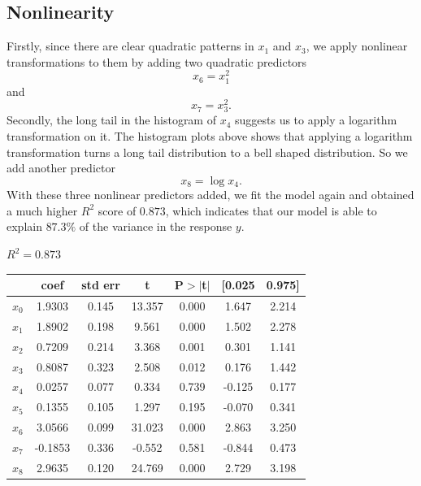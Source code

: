 \documentclass{article}
\begin{document}
\subsection{Nonlinearity}
Firstly, since there are clear quadratic patterns in $x_1$ and $x_3$, we apply nonlinear transformations to them by adding two quadratic predictors $$x_6 = x_1^2 $$ and $$x_7 = x_3^2.$$ Secondly, the long tail in the histogram of $x_4$ suggests us to apply a logarithm transformation on it. The histogram plots above shows that applying a logarithm transformation turns a long tail distribution to a bell shaped distribution. So we add another predictor $$x_8 = \log x_4.$$ With these three nonlinear predictors added, we fit the model again and obtained a much higher $R^2$ score of $0.873$, which indicates that our model is able to explain $87.3\%$ of the variance in the response $y$. 
\begin{center}
$R^2 = 0.873$\\
\begin{tabular}{lcccccc}
\hline
           & \textbf{coef} & \textbf{std err} & \textbf{t} & \textbf{P$> |$t$|$} & \textbf{[0.025} & \textbf{0.975]}  \\
\midrule
\textbf{$x_0$} &       1.9303  &        0.145     &    13.357  &         0.000        &        1.647    &        2.214     \\
\textbf{$x_1$} &       1.8902  &        0.198     &     9.561  &         0.000        &        1.502    &        2.278     \\
\textbf{$x_2$} &       0.7209  &        0.214     &     3.368  &         0.001        &        0.301    &        1.141     \\
\textbf{$x_3$} &       0.8087  &        0.323     &     2.508  &         0.012        &        0.176    &        1.442     \\
\textbf{$x_4$} &       0.0257  &        0.077     &     0.334  &         0.739        &       -0.125    &        0.177     \\
\textbf{$x_5$} &       0.1355  &        0.105     &     1.297  &         0.195        &       -0.070    &        0.341     \\
\textbf{$x_6$} &       3.0566  &        0.099     &    31.023  &         0.000        &        2.863    &        3.250     \\
\textbf{$x_7$} &      -0.1853  &        0.336     &    -0.552  &         0.581        &       -0.844    &        0.473     \\
\textbf{$x_8$} &       2.9635  &        0.120     &    24.769  &         0.000        &        2.729    &        3.198     \\
\bottomrule
\end{tabular}
\end{center}
\end{document}
